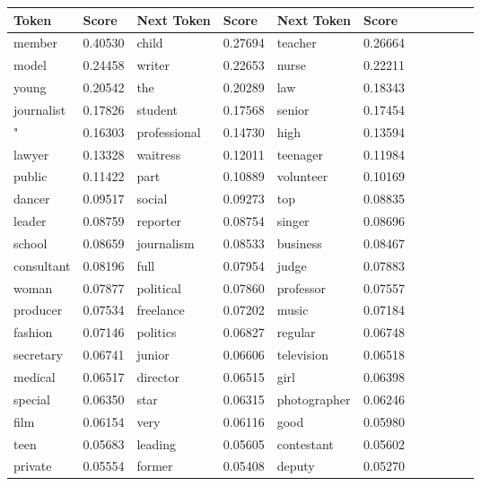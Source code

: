 \begin{table}[h]
\centering
\begin{tabular}{|l|l|l|l|l|l|}
\hline
Token & Score & Next Token & Score & Next Token & Score \\ \hline
 member & 0.40530 &  child & 0.27694 &  teacher & 0.26664 & & & & & & \\ \hline
 model & 0.24458 &  writer & 0.22653 &  nurse & 0.22211 & & & & & & \\ \hline
 young & 0.20542 &  the & 0.20289 &  law & 0.18343 & & & & & & \\ \hline
 journalist & 0.17826 &  student & 0.17568 &  senior & 0.17454 & & & & & & \\ \hline
 " & 0.16303 &  professional & 0.14730 &  high & 0.13594 & & & & & & \\ \hline
 lawyer & 0.13328 &  waitress & 0.12011 &  teenager & 0.11984 & & & & & & \\ \hline
 public & 0.11422 &  part & 0.10889 &  volunteer & 0.10169 & & & & & & \\ \hline
 dancer & 0.09517 &  social & 0.09273 &  top & 0.08835 & & & & & & \\ \hline
 leader & 0.08759 &  reporter & 0.08754 &  singer & 0.08696 & & & & & & \\ \hline
 school & 0.08659 &  journalism & 0.08533 &  business & 0.08467 & & & & & & \\ \hline
 consultant & 0.08196 &  full & 0.07954 &  judge & 0.07883 & & & & & & \\ \hline
 woman & 0.07877 &  political & 0.07860 &  professor & 0.07557 & & & & & & \\ \hline
 producer & 0.07534 &  freelance & 0.07202 &  music & 0.07184 & & & & & & \\ \hline
 fashion & 0.07146 &  politics & 0.06827 &  regular & 0.06748 & & & & & & \\ \hline
 secretary & 0.06741 &  junior & 0.06606 &  television & 0.06518 & & & & & & \\ \hline
 medical & 0.06517 &  director & 0.06515 &  girl & 0.06398 & & & & & & \\ \hline
 special & 0.06350 &  star & 0.06315 &  photographer & 0.06246 & & & & & & \\ \hline
 film & 0.06154 &  very & 0.06116 &  good & 0.05980 & & & & & & \\ \hline
 teen & 0.05683 &  leading & 0.05605 &  contestant & 0.05602 & & & & & & \\ \hline
 private & 0.05554 &  former & 0.05408 &  deputy & 0.05270 & & & & & & \\ \hline

\end{tabular}
\end{table}
